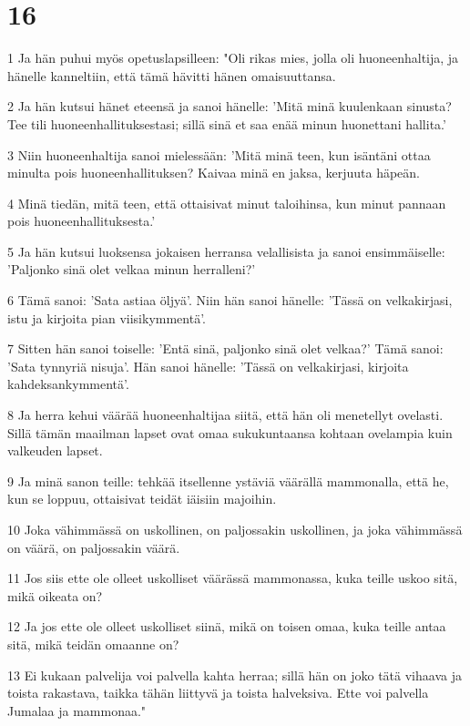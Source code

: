 \chapter{16}

\par 1 Ja hän puhui myös opetuslapsilleen: "Oli rikas mies, jolla oli huoneenhaltija, ja hänelle kanneltiin, että tämä hävitti hänen omaisuuttansa.
\par 2 Ja hän kutsui hänet eteensä ja sanoi hänelle: 'Mitä minä kuulenkaan sinusta? Tee tili huoneenhallituksestasi; sillä sinä et saa enää minun huonettani hallita.'
\par 3 Niin huoneenhaltija sanoi mielessään: 'Mitä minä teen, kun isäntäni ottaa minulta pois huoneenhallituksen? Kaivaa minä en jaksa, kerjuuta häpeän.
\par 4 Minä tiedän, mitä teen, että ottaisivat minut taloihinsa, kun minut pannaan pois huoneenhallituksesta.'
\par 5 Ja hän kutsui luoksensa jokaisen herransa velallisista ja sanoi ensimmäiselle: 'Paljonko sinä olet velkaa minun herralleni?'
\par 6 Tämä sanoi: 'Sata astiaa öljyä'. Niin hän sanoi hänelle: 'Tässä on velkakirjasi, istu ja kirjoita pian viisikymmentä'.
\par 7 Sitten hän sanoi toiselle: 'Entä sinä, paljonko sinä olet velkaa?' Tämä sanoi: 'Sata tynnyriä nisuja'. Hän sanoi hänelle: 'Tässä on velkakirjasi, kirjoita kahdeksankymmentä'.
\par 8 Ja herra kehui väärää huoneenhaltijaa siitä, että hän oli menetellyt ovelasti. Sillä tämän maailman lapset ovat omaa sukukuntaansa kohtaan ovelampia kuin valkeuden lapset.
\par 9 Ja minä sanon teille: tehkää itsellenne ystäviä väärällä mammonalla, että he, kun se loppuu, ottaisivat teidät iäisiin majoihin.
\par 10 Joka vähimmässä on uskollinen, on paljossakin uskollinen, ja joka vähimmässä on väärä, on paljossakin väärä.
\par 11 Jos siis ette ole olleet uskolliset väärässä mammonassa, kuka teille uskoo sitä, mikä oikeata on?
\par 12 Ja jos ette ole olleet uskolliset siinä, mikä on toisen omaa, kuka teille antaa sitä, mikä teidän omaanne on?
\par 13 Ei kukaan palvelija voi palvella kahta herraa; sillä hän on joko tätä vihaava ja toista rakastava, taikka tähän liittyvä ja toista halveksiva. Ette voi palvella Jumalaa ja mammonaa."
